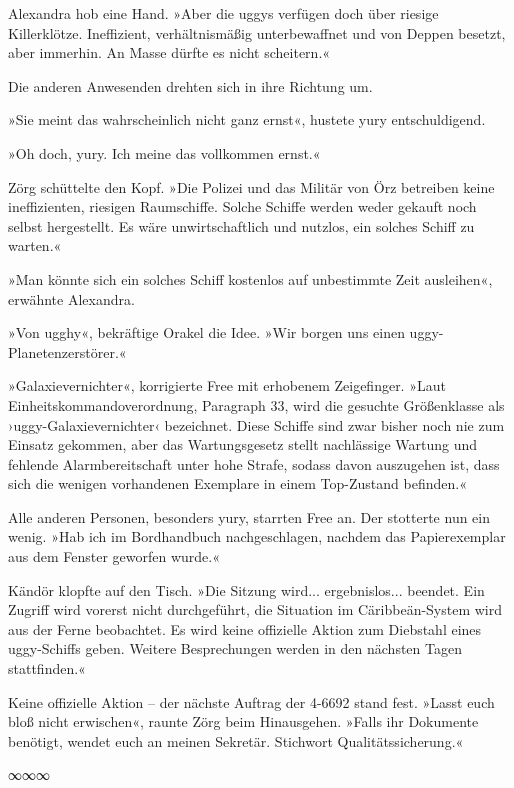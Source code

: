 Alexandra hob eine Hand. »Aber die uggys verfügen doch über riesige Killerklötze. Ineffizient, verhältnismäßig unterbewaffnet und von Deppen besetzt, aber immerhin. An Masse dürfte es nicht scheitern.«

Die anderen Anwesenden drehten sich in ihre Richtung um.

»Sie meint das wahrscheinlich nicht ganz ernst«, hustete yury entschuldigend.

»Oh doch, yury. Ich meine das vollkommen ernst.«

Zörg schüttelte den Kopf. »Die Polizei und das Militär von Örz betreiben keine ineffizienten, riesigen Raumschiffe. Solche Schiffe werden weder gekauft noch selbst hergestellt. Es wäre unwirtschaftlich und nutzlos, ein solches Schiff zu warten.«

»Man könnte sich ein solches Schiff kostenlos auf unbestimmte Zeit ausleihen«, erwähnte Alexandra.

»Von ugghy«, bekräftige Orakel die Idee. »Wir borgen uns einen uggy-Planetenzerstörer.«

»Galaxievernichter«, korrigierte Free mit erhobenem Zeigefinger. »Laut Einheitskommandoverordnung, Paragraph 33, wird die gesuchte Größenklasse als ›uggy-Galaxievernichter‹ bezeichnet. Diese Schiffe sind zwar bisher noch nie zum Einsatz gekommen, aber das Wartungsgesetz stellt nachlässige Wartung und fehlende Alarmbereitschaft unter hohe Strafe, sodass davon auszugehen ist, dass sich die wenigen vorhandenen Exemplare in einem Top-Zustand befinden.«

Alle anderen Personen, besonders yury, starrten Free an. Der stotterte nun ein wenig. »Hab ich im Bordhandbuch nachgeschlagen, nachdem das Papierexemplar aus dem Fenster geworfen wurde.«

Kändör klopfte auf den Tisch. »Die Sitzung wird... ergebnislos... beendet. Ein Zugriff wird vorerst nicht durchgeführt, die Situation im Cäribbeän-System wird aus der Ferne beobachtet. Es wird keine offizielle Aktion zum Diebstahl eines uggy-Schiffs geben. Weitere Besprechungen werden in den nächsten Tagen stattfinden.«

Keine offizielle Aktion – der nächste Auftrag der 4-6692 stand fest. »Lasst euch bloß nicht erwischen«, raunte Zörg beim Hinausgehen. »Falls ihr Dokumente benötigt, wendet euch an meinen Sekretär. Stichwort Qualitätssicherung.«

\begin{center}
∞∞∞
\end{center}

